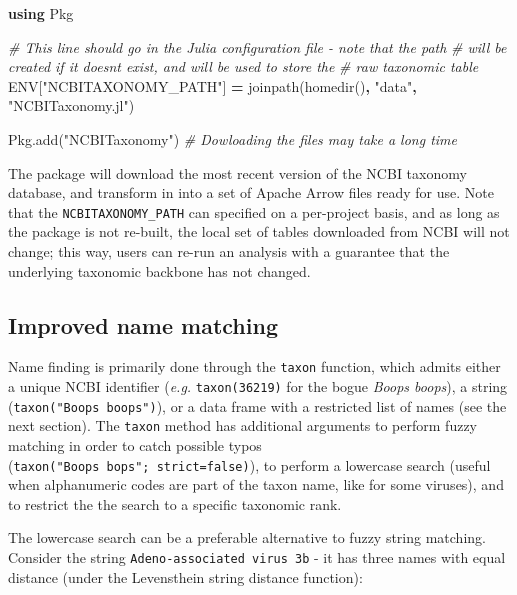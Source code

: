 \documentclass[10pt,oneside]{article}
\newenvironment{Shaded}{\begin{snugshade}}{\end{snugshade}}
\newcommand{\KeywordTok}[1]{\textcolor[rgb]{0.13,0.29,0.53}{\textbf{#1}}}
\newcommand{\ConstantTok}[1]{\textcolor[rgb]{0.00,0.00,0.00}{#1}}
\newcommand{\StringTok}[1]{\textcolor[rgb]{0.31,0.60,0.02}{#1}}
\newcommand{\CommentTok}[1]{\textcolor[rgb]{0.56,0.35,0.01}{\textit{#1}}}
\newcommand{\OperatorTok}[1]{\textcolor[rgb]{0.81,0.36,0.00}{\textbf{#1}}}
\newcommand{\NormalTok}[1]{#1}
\begin{document}
\begin{Shaded}
\begin{Highlighting}[]
\KeywordTok{using}\NormalTok{ Pkg}

\CommentTok{\# This line should go in the Julia configuration file {-} note that the path}
\CommentTok{\# will be created if it doesn\textquotesingle{}t exist, and will be used to store the}
\CommentTok{\# raw taxonomic table}
\ConstantTok{ENV}\NormalTok{[}\StringTok{"NCBITAXONOMY\_PATH"}\NormalTok{] }\OperatorTok{=}\NormalTok{ joinpath(homedir()}\OperatorTok{,} \StringTok{"data"}\OperatorTok{,} \StringTok{"NCBITaxonomy.jl"}\NormalTok{)}

\NormalTok{Pkg.add(}\StringTok{"NCBITaxonomy"}\NormalTok{) }\CommentTok{\# Dowloading the files may take a long time}
\end{Highlighting}
\end{Shaded}

The package will download the most recent version of the NCBI taxonomy
database, and transform in into a set of Apache Arrow files ready for
use. Note that the \texttt{NCBITAXONOMY\_PATH} can specified on a
per-project basis, and as long as the package is not re-built, the local
set of tables downloaded from NCBI will not change; this way, users can
re-run an analysis with a guarantee that the underlying taxonomic
backbone has not changed.

\hypertarget{improved-name-matching}{%
\subsection{Improved name matching}\label{improved-name-matching}}

Name finding is primarily done through the \texttt{taxon} function,
which admits either a unique NCBI identifier (\emph{e.g.}
\texttt{taxon(36219)} for the bogue \emph{Boops boops}), a string
(\texttt{taxon("Boops\ boops")}), or a data frame with a restricted list
of names (see the next section). The \texttt{taxon} method has
additional arguments to perform fuzzy matching in order to catch
possible typos (\texttt{taxon("Boops\ bops";\ strict=false)}), to
perform a lowercase search (useful when alphanumeric codes are part of
the taxon name, like for some viruses), and to restrict the the search
to a specific taxonomic rank.

The lowercase search can be a preferable alternative to fuzzy string
matching. Consider the string \texttt{Adeno-associated\ virus\ 3b} - it
has three names with equal distance (under the Levensthein string
distance function):
\end{document}
